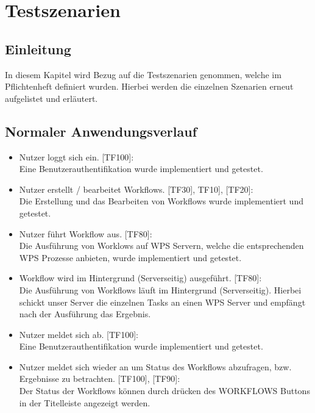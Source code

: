 \chapter{Testszenarien}

    \section{Einleitung}
    In diesem Kapitel wird Bezug auf die Testszenarien genommen, welche im Pflichtenheft definiert wurden. Hierbei werden die einzelnen Szenarien erneut aufgelistet und erläutert.

            \section{Normaler Anwendungsverlauf}
        \begin{itemize}
            \item Nutzer loggt sich ein. [TF100]:
            \vspace{1mm}\\Eine Benutzerauthentifikation wurde implementiert und getestet.
            \item Nutzer erstellt / bearbeitet Workflows. [TF30], TF10], [TF20]:
            \vspace{1mm}\\Die Erstellung und das Bearbeiten von Workflows wurde implementiert und getestet.
            \item Nutzer führt Workflow aus. [TF80]:
            \vspace{1mm}\\Die Ausführung von Worklows auf WPS Servern, welche die entsprechenden WPS Prozesse anbieten, wurde implementiert und getestet. 
            \item Workflow wird im Hintergrund (Serverseitig) ausgeführt. [TF80]:
            \vspace{1mm}\\Die Ausführung von Workflows läuft im Hintergrund (Serverseitig). Hierbei schickt unser Server die einzelnen Tasks an einen WPS Server und empfängt nach der Ausführung das Ergebnis.
            \item Nutzer meldet sich ab. [TF100]:
            \vspace{1mm}\\Eine Benutzerauthentifikation wurde implementiert und getestet.
            \item Nutzer meldet sich wieder an um Status des Workflows abzufragen, bzw. Ergebnisse zu betrachten. [TF100], [TF90]:
            \vspace{1mm}\\Der Status der Workflows können durch drücken des \glqq WORKFLOWS\grqq{} Buttons in der Titelleiste angezeigt werden. 
        \end{itemize}
